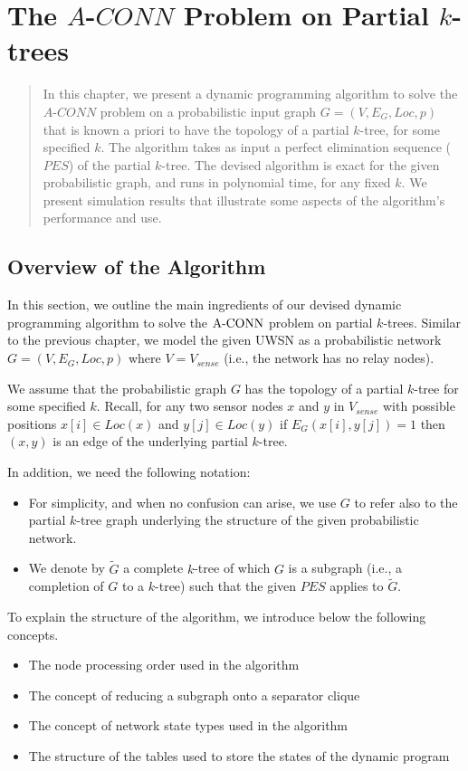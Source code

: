 \chapter{The $A$-$CONN$ Problem on Partial $k$-trees}
\label{subsec:mainAlg}
\begin{quote}

In this chapter, we present a dynamic programming algorithm to solve the $A$-$CONN$ problem on a probabilistic input graph $G=(V,E_G,Loc,p)$ that is known a priori to have the topology of a partial $k$-tree, for some specified $k$. The algorithm takes as input a perfect elimination sequence ($PES$) of the partial $k$-tree. The devised algorithm is exact for the given probabilistic graph, and runs in polynomial time, for any fixed $k$. We present simulation results that illustrate some aspects of the algorithm's performance and use.
\end{quote}

\section{Overview of the Algorithm}
\label{sec:obv}

In this section, we outline the main ingredients of our devised dynamic programming algorithm to solve the ${\mathrm {A\mbox{-}CONN}}$ problem on partial $k$-trees. Similar to the previous chapter, we model the given UWSN as a probabilistic network $G=(V,E_G,Loc,p)$ where  $V=V_{sense}$ (i.e., the network has no relay nodes).

We assume that the probabilistic graph $G$ has the topology of a partial $k$-tree for some specified $k$. Recall, for any two sensor nodes $x$ and $y$ in $V_{sense}$ with possible positions $x[i] \in Loc(x)$ and $y[j] \in Loc(y)$ if $E_G(x[i],y[j])=1$ then $(x,y)$ is an edge of the underlying partial $k$-tree.

In addition, we need the following notation:
\begin{itemize}[noitemsep]
\item  For simplicity, and when no confusion can arise, we use $G$ to refer also to the partial $k$-tree graph underlying the structure of the given probabilistic network.
 \item We denote by $\tilde{G}$ a complete $k$-tree of which $G$ is a subgraph (i.e., a completion of $G$ to a $k$-tree) such that the given $PES$ applies to $\tilde{G}$.

\end{itemize}

To explain the structure of the algorithm, we introduce below the following concepts.
\begin{itemize}[noitemsep]
\item The node processing order used in the algorithm
\item The concept of reducing a subgraph onto a separator clique
\item The concept of network state types used in the algorithm
\item The structure of the tables used to store the states of the dynamic program
\end{itemize} 

